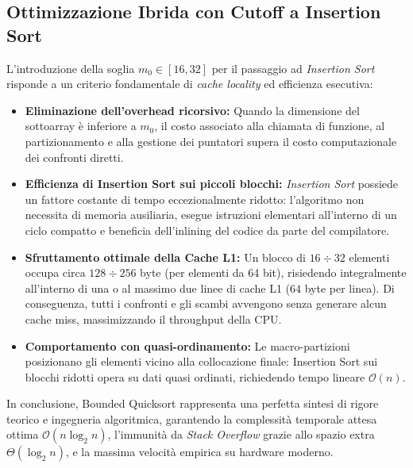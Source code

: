 \FloatBarrier
\subsection{Ottimizzazione Ibrida con Cutoff a Insertion Sort}
\label{subsec:bqs-cutoff-insertion-sort}

L'introduzione della soglia $m_0 \in [16, 32]$ per il passaggio ad \textit{Insertion Sort} risponde a un criterio fondamentale di \textit{cache locality} ed efficienza esecutiva:

\begin{itemize}
  \item \textbf{Eliminazione dell'overhead ricorsivo:} Quando la dimensione del sottoarray è inferiore a $m_0$, il costo associato alla chiamata di funzione, al partizionamento e alla gestione dei puntatori supera il costo computazionale dei confronti diretti.
  \item \textbf{Efficienza di Insertion Sort sui piccoli blocchi:} \textit{Insertion Sort} possiede un fattore costante di tempo eccezionalmente ridotto: l'algoritmo non necessita di memoria ausiliaria, esegue istruzioni elementari all'interno di un ciclo compatto e beneficia dell'inlining del codice da parte del compilatore.
  \item \textbf{Sfruttamento ottimale della Cache L1:} Un blocco di $16 \div 32$ elementi occupa circa $128 \div 256$ byte (per elementi da 64 bit), risiedendo integralmente all'interno di una o al massimo due linee di cache L1 ($64$ byte per linea). Di conseguenza, tutti i confronti e gli scambi avvengono senza generare alcun cache miss, massimizzando il throughput della CPU.
  \item \textbf{Comportamento con quasi-ordinamento:} Le macro-partizioni posizionano gli elementi vicino alla collocazione finale: Insertion Sort sui blocchi ridotti opera su dati quasi ordinati, richiedendo tempo lineare $\mathcal{O}(n)$.
\end{itemize}

In conclusione, Bounded Quicksort rappresenta una perfetta sintesi di rigore teorico e ingegneria algoritmica, garantendo la complessità temporale attesa ottima $\mathcal{O}(n \log_2 n)$, l'immunità da \textit{Stack Overflow} grazie allo spazio extra $\Theta(\log_2 n)$, e la massima velocità empirica su hardware moderno.
